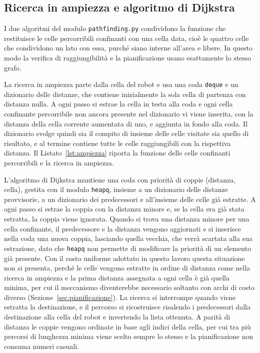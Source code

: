 \subsection{Ricerca in ampiezza e algoritmo di Dijkstra}
\label{sec:algoritmi}

I due algoritmi del modulo \texttt{pathfinding.py} condividono la funzione che restituisce le celle percorribili confinanti con una cella data, cioè le quattro celle che condividono un lato con essa, purché siano interne all'area e libere. In questo modo la verifica di raggiungibilità e la pianificazione usano esattamente lo stesso grafo.

La ricerca in ampiezza parte dalla cella del robot e usa una coda \texttt{deque} e un dizionario delle distanze, che contiene inizialmente la sola cella di partenza con distanza nulla. A ogni passo si estrae la cella in testa alla coda e ogni cella confinante percorribile non ancora presente nel dizionario vi viene inserita, con la distanza della cella corrente aumentata di uno, e aggiunta in fondo alla coda. Il dizionario svolge quindi sia il compito di insieme delle celle visitate sia quello di risultato, e al termine contiene tutte le celle raggiungibili con la rispettiva distanza. Il Listato~\ref{lst:ampiezza} riporta la funzione delle celle confinanti percorribili e la ricerca in ampiezza.

L'algoritmo di Dijkstra mantiene una coda con priorità di coppie (distanza, cella), gestita con il modulo \texttt{heapq}, insieme a un dizionario delle distanze provvisorie, a un dizionario dei predecessori e all'insieme delle celle già estratte. A ogni passo si estrae la coppia con la distanza minore e, se la cella era già stata estratta, la coppia viene ignorata. Quando si trova una distanza minore per una cella confinante, il predecessore e la distanza vengono aggiornati e si inserisce nella coda una nuova coppia, lasciando quella vecchia, che verrà scartata alla sua estrazione, dato che \texttt{heapq} non permette di modificare la priorità di un elemento già presente. Con il costo uniforme adottato in questo lavoro questa situazione non si presenta, perché le celle vengono estratte in ordine di distanza come nella ricerca in ampiezza e la prima distanza assegnata a ogni cella è già quella minima, per cui il meccanismo diventerebbe necessario soltanto con archi di costo diverso (Sezione~\ref{sec:pianificazione}). La ricerca si interrompe quando viene estratta la destinazione, e il percorso si ricostruisce risalendo i predecessori dalla destinazione alla cella del robot e invertendo la lista ottenuta. A parità di distanza le coppie vengono ordinate in base agli indici della cella, per cui tra più percorsi di lunghezza minima viene scelto sempre lo stesso e la pianificazione non consuma numeri casuali.

